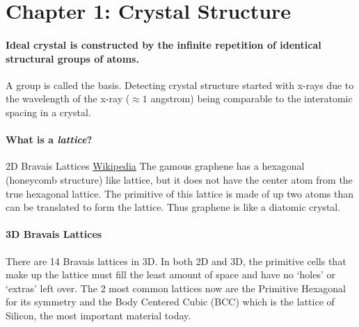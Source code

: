\documentclass[../main.tex]{subfiles}
\begin{document}
\pagestyle{fancy}
\section*{Chapter 1: Crystal Structure}


\paragraph{Ideal crystal is constructed by the infinite repetition of identical structural groups of
atoms.} A group is called the basis. Detecting crystal structure started with x-rays due to the
wavelength of the x-ray ($\approx 1$ angstrom) being comparable to the interatomic spacing in a crystal.

\paragraph{What is a \emph{lattice}?}

2D Bravais Lattices \href{https://en.wikipedia.org/wiki/Bravais_lattice}{Wikipedia}
The gamous graphene has a hexagonal (honeycomb structure) like lattice, but it does not have the 
center atom from the true hexagonal lattice. The primitive of this lattice is made of up two atoms
than can be translated to form the lattice. Thus graphene is like a diatomic crystal. 

\paragraph{3D Bravais Lattices} There are 14 Bravais lattices in 3D. In both 2D and 3D, the primitive
cells that make up the lattice must fill the least amount of space and have no `holes' or `extras' left
over. The 2 most common lattices now are the Primitive Hexagonal for its symmetry and the Body
Centered Cubic (BCC) which is the lattice of Silicon, the most important material today. 
\end{document}
